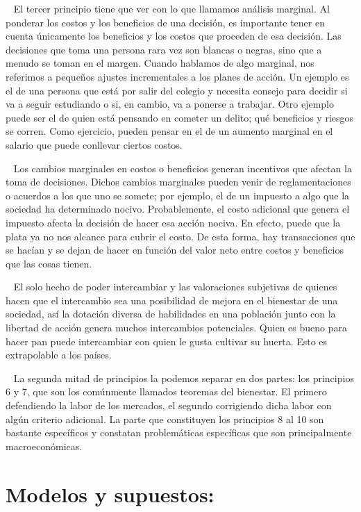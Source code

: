 \documentclass[
  letterpaper,
  DIV=11,
  numbers=noendperiod]{scrreport}
\begin{document}
~ El tercer principio tiene que ver con lo que llamamos análisis
marginal. Al ponderar los costos y los beneficios de una decisión, es
importante tener en cuenta únicamente los beneficios y los costos que
proceden de esa decisión. Las decisiones que toma una persona rara vez
son blancas o negras, sino que a menudo se toman en el margen. Cuando
hablamos de algo marginal, nos referimos a pequeños ajustes
incrementales a los planes de acción. Un ejemplo es el de una persona
que está por salir del colegio y necesita consejo para decidir si va a
seguir estudiando o si, en cambio, va a ponerse a trabajar. Otro ejemplo
puede ser el de quien está pensando en cometer un delito; qué beneficios
y riesgos se corren. Como ejercicio, pueden pensar en el de un aumento
marginal en el salario que puede conllevar ciertos costos.

~ Los cambios marginales en costos o beneficios generan incentivos que
afectan la toma de decisiones. Dichos cambios marginales pueden venir de
reglamentaciones o acuerdos a los que uno se somete; por ejemplo, el de
un impuesto a algo que la sociedad ha determinado nocivo. Probablemente,
el costo adicional que genera el impuesto afecta la decisión de hacer
esa acción nociva. En efecto, puede que la plata ya no nos alcance para
cubrir el costo. De esta forma, hay transacciones que se hacían y se
dejan de hacer en función del valor neto entre costos y beneficios que
las cosas tienen.

~ El solo hecho de poder intercambiar y las valoraciones subjetivas de
quienes hacen que el intercambio sea una posibilidad de mejora en el
bienestar de una sociedad, así la dotación diversa de habilidades en una
población junto con la libertad de acción genera muchos intercambios
potenciales. Quien es bueno para hacer pan puede intercambiar con quien
le gusta cultivar su huerta. Esto es extrapolable a los países.

~ La segunda mitad de principios la podemos separar en dos partes: los
principios 6 y 7, que son los comúnmente llamados teoremas del
bienestar. El primero defendiendo la labor de los mercados, el segundo
corrigiendo dicha labor con algún criterio adicional. La parte que
constituyen los principios 8 al 10 son bastante específicos y constatan
problemáticas específicas que son principalmente macroeconómicas.

\hypertarget{modelos-y-supuestos}{%
\section{Modelos y supuestos:}\label{modelos-y-supuestos}}
\end{document}
